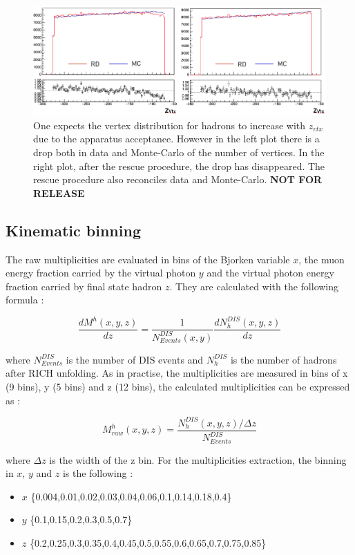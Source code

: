 \documentclass[letterpaper,12pt]{article}
\begin{document}
\begin{figure}[!h]
	\includegraphics[scale=0.45]{./gfx/VertexDrop.png}
	\caption{One expects the vertex distribution for hadrons to increase with $z_{vtx}$ due to the apparatus acceptance. However in the left plot there is a drop both in data and Monte-Carlo of the number of vertices. In the right plot, after the rescue procedure, the drop has disappeared. The rescue procedure also reconciles data and Monte-Carlo. \textbf{NOT FOR RELEASE}}
	\label{VertexDrop}
\end{figure}

\subsection{Kinematic binning}

The raw multiplicities are evaluated in bins of the Bjorken variable $x$, the muon energy fraction carried
by the virtual photon $y$ and the virtual photon energy fraction carried by final state hadron $z$. They
are calculated with the following formula :

\begin{equation}
  \frac{dM^h(x,y,z)}{dz}=\frac{1}{N^{DIS}_{Events}(x,y)}\frac{dN^{DIS}_{h}(x,y,z)}{dz}
\end{equation}

where $N^{DIS}_{Events}$ is the number of DIS events and $N^{DIS}_{h}$ is the number of
hadrons after RICH unfolding. As in practise, the multiplicities are measured in bins of
x (9 bins), y (5 bins) and z (12 bins), the calculated multiplicities can be expressed as :

\begin{equation}
  M^h_{raw}(x,y,z) = \frac{N^{DIS}_{h}(x,y,z)/\Delta z}{N^{DIS}_{Events}}
\end{equation}

where $\Delta z$ is the width of the z bin. For the multiplicities extraction, the binning in
$x$, $y$ and $z$ is the following :

\begin{itemize}
  \item $x$ \{0.004,0.01,0.02,0.03,0.04,0.06,0.1,0.14,0.18,0.4\}
  \item $y$ \{0.1,0.15,0.2,0.3,0.5,0.7\}
  \item $z$ \{0.2,0.25,0.3,0.35,0.4,0.45,0.5,0.55,0.6,0.65,0.7,0.75,0.85\}
\end{itemize}
\end{document}
